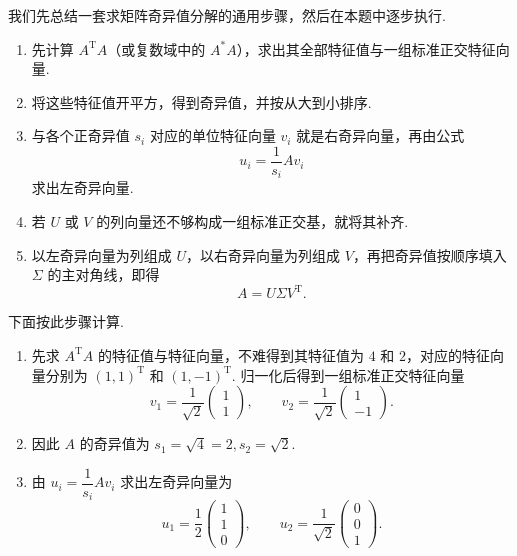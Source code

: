\begin{solution}
    我们先总结一套求矩阵奇异值分解的通用步骤，然后在本题中逐步执行.

    \begin{enumerate}
        \item 先计算 $A^{\mathrm{T}}A$（或复数域中的 $A^*A$），求出其全部特征值与一组标准正交特征向量.

        \item 将这些特征值开平方，得到奇异值，并按从大到小排序.

        \item 与各个正奇异值 $s_i$ 对应的单位特征向量 $v_i$ 就是右奇异向量，再由公式
              \[
                  u_i = \frac{1}{s_i}Av_i
              \]
              求出左奇异向量.

        \item 若 $U$ 或 $V$ 的列向量还不够构成一组标准正交基，就将其补齐.

        \item 以左奇异向量为列组成 $U$，以右奇异向量为列组成 $V$，再把奇异值按顺序填入 $\Sigma$ 的主对角线，即得
              \[
                  A = U\Sigma V^{\mathrm{T}}.
              \]
    \end{enumerate}

    下面按此步骤计算.

    \begin{enumerate}
        \item 先求 $A^{\mathrm{T}}A$ 的特征值与特征向量，不难得到其特征值为 $4$ 和 $2$，对应的特征向量分别为 $(1, 1)^{\mathrm{T}}$ 和 $(1, -1)^{\mathrm{T}}$. 归一化后得到一组标准正交特征向量
              \[
                  v_1 = \frac{1}{\sqrt{2}}\begin{pmatrix}
                      1 \\
                      1
                  \end{pmatrix},\qquad
                  v_2 = \frac{1}{\sqrt{2}}\begin{pmatrix}
                      1  \\
                      -1
                  \end{pmatrix}.
              \]

        \item 因此 $A$ 的奇异值为 $s_1 = \sqrt{4} = 2, s_2 = \sqrt{2}$.

        \item 由 $u_i = \dfrac{1}{s_i}Av_i$ 求出左奇异向量为
              \[ u_1 = \frac{1}{2}\begin{pmatrix}
                      1 \\
                      1 \\
                      0
                  \end{pmatrix}, \qquad u_2 = \frac{1}{\sqrt{2}}\begin{pmatrix}
                      0 \\
                      0 \\
                      1
                  \end{pmatrix}. \]


\end{enumerate}
\end{solution}
